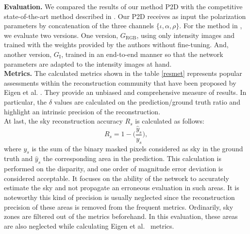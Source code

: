 \textbf{Evaluation.} We compared the results of our method P2D with the competitive state-of-the-art method described in \cite{godard2019digging}. Our P2D receives as input the polarization parameters by concatenation of the three channels $\{\iota, \alpha, \rho\}$. For the method in \cite{godard2019digging}, we evaluate two versions. One version, $G_{\textrm{RGB}}$, using only intensity images and trained with the weights provided by the authors without fine-tuning. And, another version, $G_{\textrm{I}}$, trained in an end-to-end manner so that the network parameters are adapted to the intensity images at hand.\\


\textbf{Metrics. }The calculated metrics shown in the table \ref{resmet} represents popular assessments within the reconstruction community that have been proposed by Eigen et al. \cite{eigen2014depth}. They provide an unbiased and comprehensive measure of results. In particular, the $\delta$ values are calculated on the prediction/ground truth ratio and highlight an intrinsic precision of the reconstruction.\\

At last, the sky reconstruction accuracy $R_s$ is calculated as follows:
\begin{equation}\label{reconSky}
R_s = 1 - \Big(\frac{\hat{y}_s}{y_s}\Big),
\end{equation}
where $y_s$ is the sum of the binary masked pixels considered as sky in the ground truth and $\hat{y}_s$ the corresponding area in the prediction. This calculation is performed on the disparity, and one order of magnitude error deviation is considered acceptable.
It focuses on the ability of the network to accurately estimate the sky and not propagate an erroneous evaluation in such areas. It is noteworthy this kind of precision is usually neglected since the reconstruction precision of these areas is removed from the frequent metrics. Ordinarily, sky zones are filtered out of the metrics beforehand. In this evaluation, these areas are also neglected while calculating Eigen et al.~\cite{eigen2014depth} metrics.

